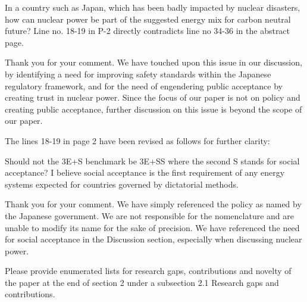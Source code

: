 \documentclass[answers,11pt]{exam}
\begin{document}
\begin{questions}
\begin{solution}
                 
        \end{solution}

                        \question In a country such as Japan, which has been badly impacted by nuclear disasters, how can nuclear power be part of the suggested energy mix for carbon neutral future? Line no. 18-19 in P-2 directly contradicts line no 34-36 in the abstract page.
        
        \begin{solution}
        
                 Thank you for your comment. We have touched upon this issue in our discussion, by identifying a need for improving safety standards within the Japanese regulatory framework, and for the need of engendering public acceptance by creating trust in nuclear power. Since the focus of our paper is not on policy and creating public acceptance, further discussion on this issue is beyond the scope of our paper.
                 
                 The lines 18-19 in page 2 have been revised as follows for further clarity:
                 
                 
        \end{solution}


  
                        \question  Should not the 3E+S benchmark be 3E+SS where the second S stands for social acceptance? I believe social acceptance is the first requirement of any energy systems expected for countries governed by dictatorial methods.
        
        \begin{solution}
        
                 Thank you for your comment. We have simply referenced the policy as named by the Japanese government. We are not responsible for the nomenclature and are unable to modify its name for the sake of precision. We have referenced the need for social acceptance in the Discussion section, especially when discussing nuclear power.
                 
                 
        \end{solution}      
        
        
                        \question   Please provide enumerated lists for research gaps, contributions and novelty of the paper at the end of section 2 under a subsection 2.1 Research gaps and contributions.
                                

\end{questions}
\end{document}
